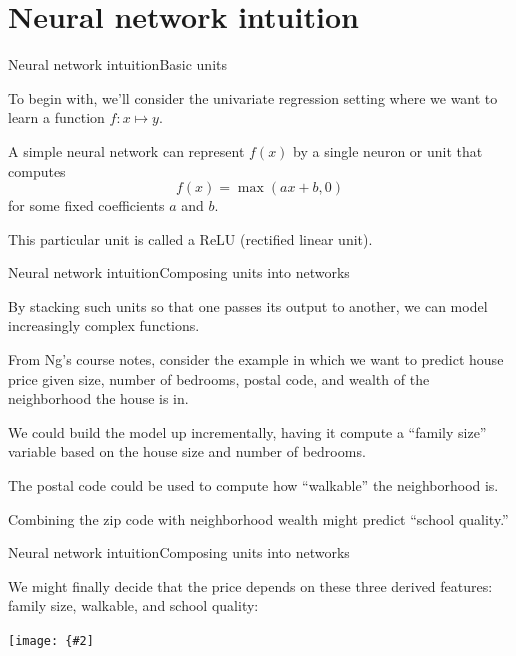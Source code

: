 \documentclass{beamer}
\newcommand{\myfig}[3]{\centerline{\texttt{[image: \{\#2]}}}
\begin{document}
\section{Neural network intuition}

\begin{frame}{Neural network intuition}{Basic units}

  To begin with, we'll consider the univariate regression setting
  where we want to learn a function $f : x \mapsto y$.

  \medskip

  A simple neural network can represent $f(x)$ by a single
  \alert{neuron} or \alert{unit} that computes
  \[ f(x) = \max(ax+b,0) \]
  for some fixed coefficients $a$ and $b$.

  \medskip

  This particular unit
  is called a \alert{ReLU} (rectified linear unit).

\end{frame}


\begin{frame}{Neural network intuition}{Composing units into networks}

  By stacking such units so that one passes its output to another, we can
  model increasingly complex functions.

  \medskip

  From Ng's course notes, consider the example in which we want to
  predict \alert{house price} given size, number of bedrooms, postal
  code, and wealth of the neighborhood the house is in.

  \medskip

  We could build the model up incrementally, having it compute
  a ``family size'' variable based on the house size and number of bedrooms.

  \medskip

  The postal code could be used to compute how ``walkable'' the neighborhood
  is.

  \medskip

  Combining the zip code with neighborhood wealth might predict
  ``school quality.''

\end{frame}


\begin{frame}{Neural network intuition}{Composing units into networks}

  We might finally decide that the price depends on these three derived
  features: family size, walkable, and school quality:

  \medskip

  \myfig{2.5in}{ng-nn}{Ng (2017), CS229 deep learning lecture notes.}

\end{frame}
\end{document}

